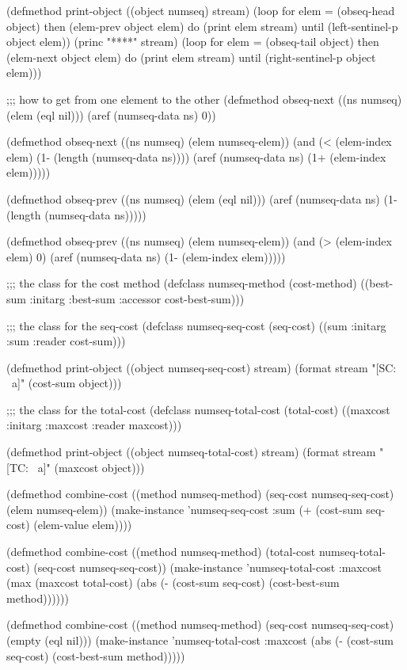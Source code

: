 (defmethod print-object ((object numseq) stream)
  (loop for elem = (obseq-head object) then (elem-prev object elem)
        do (print elem stream)
        until (left-sentinel-p object elem))
  (princ "****" stream)
  (loop for elem = (obseq-tail object) then (elem-next object elem)
        do (print elem stream)
        until (right-sentinel-p object elem)))

;;; how to get from one element to the other
(defmethod obseq-next ((ns numseq) (elem (eql nil)))
  (aref (numseq-data ns) 0))

(defmethod obseq-next ((ns numseq) (elem numseq-elem))
  (and (< (elem-index elem) (1- (length (numseq-data ns))))
       (aref (numseq-data ns) (1+ (elem-index elem)))))

(defmethod obseq-prev ((ns numseq) (elem (eql nil)))
  (aref (numseq-data ns) (1- (length (numseq-data ns)))))

(defmethod obseq-prev ((ns numseq) (elem numseq-elem))
  (and (> (elem-index elem) 0)
       (aref (numseq-data ns) (1- (elem-index elem)))))

;;; the class for the cost method
(defclass numseq-method (cost-method)
  ((best-sum :initarg :best-sum :accessor cost-best-sum)))

;;; the class for the seq-cost
(defclass numseq-seq-cost (seq-cost)
  ((sum :initarg :sum :reader cost-sum)))

(defmethod print-object ((object numseq-seq-cost) stream)
  (format stream "[SC: ~a]" (cost-sum object)))

;;; the class for the total-cost
(defclass numseq-total-cost (total-cost)
  ((maxcost :initarg :maxcost :reader maxcost)))

(defmethod print-object ((object numseq-total-cost) stream)
  (format stream "[TC: ~a]" (maxcost object)))

(defmethod combine-cost ((method numseq-method)
                         (seq-cost numseq-seq-cost)
                         (elem numseq-elem))
  (make-instance 'numseq-seq-cost :sum (+ (cost-sum seq-cost) (elem-value elem))))

(defmethod combine-cost ((method numseq-method)
                         (total-cost numseq-total-cost)
                         (seq-cost numseq-seq-cost))
  (make-instance 'numseq-total-cost
    :maxcost (max (maxcost total-cost)
                  (abs (- (cost-sum seq-cost) (cost-best-sum method))))))

(defmethod combine-cost ((method numseq-method)
                         (seq-cost numseq-seq-cost)
                         (empty (eql nil)))
  (make-instance 'numseq-total-cost
    :maxcost (abs (- (cost-sum seq-cost) (cost-best-sum method)))))

